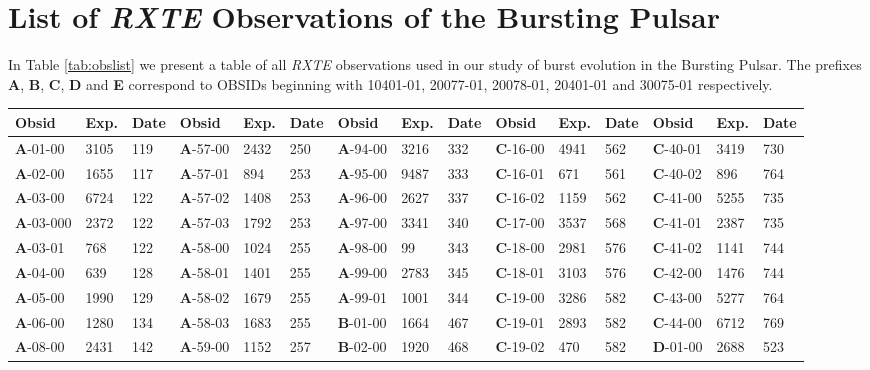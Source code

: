 \chapter{List of \textit{RXTE} Observations of the Bursting Pulsar}
\label{app:obs}

\par In Table \ref{tab:obslist} we present a table of all \textit{RXTE} observations used in our study of burst evolution in the Bursting Pulsar.  The prefixes \textbf{A}, \textbf{B}, \textbf{C}, \textbf{D} and \textbf{E} correspond to OBSIDs beginning with 10401-01, 20077-01, 20078-01, 20401-01 and 30075-01 respectively.

\begin{table*}
\centering
\begin{tabular}{lllllllllllllll}
\hline
\hline
\scriptsize Obsid&\scriptsize Exp.&\scriptsize Date&\scriptsize Obsid&\scriptsize Exp.&\scriptsize Date&\scriptsize Obsid&\scriptsize Exp.&\scriptsize Date&\scriptsize Obsid&\scriptsize Exp.&\scriptsize Date&\scriptsize Obsid&\scriptsize Exp.&\scriptsize Date\\
\hline
\textbf{A}-01-00&3105&119&\textbf{A}-57-00&2432&250&\textbf{A}-94-00&3216&332&\textbf{C}-16-00&4941&562&\textbf{C}-40-01&3419&730\\
\textbf{A}-02-00&1655&117&\textbf{A}-57-01&894&253&\textbf{A}-95-00&9487&333&\textbf{C}-16-01&671&561&\textbf{C}-40-02&896&764\\
\textbf{A}-03-00&6724&122&\textbf{A}-57-02&1408&253&\textbf{A}-96-00&2627&337&\textbf{C}-16-02&1159&562&\textbf{C}-41-00&5255&735\\
\textbf{A}-03-000&2372&122&\textbf{A}-57-03&1792&253&\textbf{A}-97-00&3341&340&\textbf{C}-17-00&3537&568&\textbf{C}-41-01&2387&735\\
\textbf{A}-03-01&768&122&\textbf{A}-58-00&1024&255&\textbf{A}-98-00&99&343&\textbf{C}-18-00&2981&576&\textbf{C}-41-02&1141&744\\
\textbf{A}-04-00&639&128&\textbf{A}-58-01&1401&255&\textbf{A}-99-00&2783&345&\textbf{C}-18-01&3103&576&\textbf{C}-42-00&1476&744\\
\textbf{A}-05-00&1990&129&\textbf{A}-58-02&1679&255&\textbf{A}-99-01&1001&344&\textbf{C}-19-00&3286&582&\textbf{C}-43-00&5277&764\\
\textbf{A}-06-00&1280&134&\textbf{A}-58-03&1683&255&\textbf{B}-01-00&1664&467&\textbf{C}-19-01&2893&582&\textbf{C}-44-00&6712&769\\
\textbf{A}-08-00&2431&142&\textbf{A}-59-00&1152&257&\textbf{B}-02-00&1920&468&\textbf{C}-19-02&470&582&\textbf{D}-01-00&2688&523\\

\end{tabular}
\end{table*}

